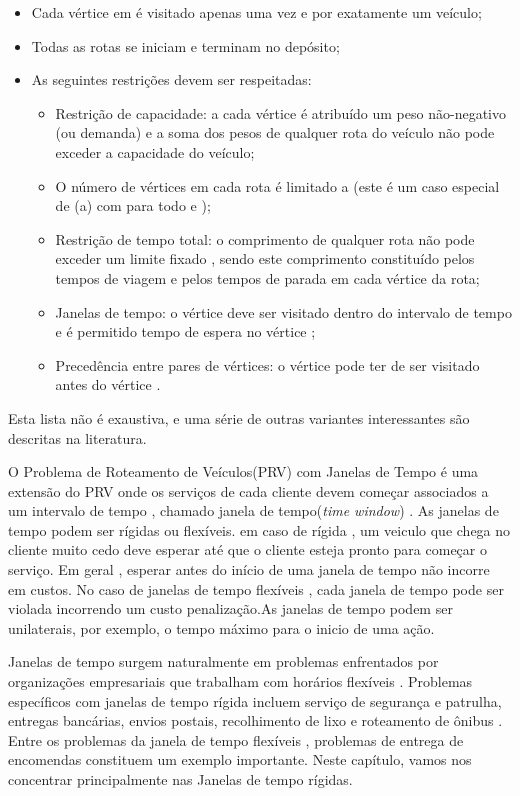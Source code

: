 \begin{itemize}
\item Cada vértice em é visitado apenas uma vez e por exatamente um veículo;
\item Todas as rotas se iniciam e terminam no depósito;
\item As seguintes restrições devem ser respeitadas:
\begin{itemize}
\item Restrição de capacidade: a cada vértice é atribuído um peso não-negativo (ou demanda) e a soma dos pesos de qualquer rota do veículo não pode exceder a capacidade do veículo;
\item O número de vértices em cada rota é limitado a (este é um caso especial de (a) com para todo e );
\item Restrição de tempo total: o comprimento de qualquer rota não pode exceder um limite fixado , sendo este comprimento constituído pelos tempos de viagem e pelos tempos de parada em cada vértice da rota; 
\item Janelas de tempo: o vértice deve ser visitado dentro do intervalo de tempo e é permitido tempo de espera no vértice ;
\item Precedência entre pares de vértices: o vértice pode ter de ser visitado antes do vértice .
\end{itemize}
\end{itemize}


Esta lista não é exaustiva, e uma série de outras variantes interessantes são descritas na literatura.


O Problema de Roteamento de Veículos(PRV) com Janelas de Tempo é uma extensão do PRV onde os serviços de cada cliente devem começar associados a um intervalo de tempo , chamado janela de tempo(\textit{time window}) . As janelas de tempo podem ser rígidas ou flexíveis. em caso de rígida , um veiculo que chega no cliente muito cedo deve esperar até que o cliente esteja pronto para começar o serviço. Em geral , esperar antes do início de uma janela de tempo não incorre em custos. No caso de janelas de tempo flexíveis , cada janela de tempo pode ser violada incorrendo um custo penalização.As janelas de tempo podem ser unilaterais, por exemplo, o tempo máximo para o inicio de uma ação.


Janelas de tempo surgem naturalmente em problemas enfrentados por organizações empresariais que trabalham com horários flexíveis . Problemas específicos com janelas de tempo rígida incluem serviço de segurança e patrulha, entregas bancárias, envios postais, recolhimento de lixo e roteamento de ônibus . Entre os problemas da janela de tempo flexíveis , problemas de entrega de encomendas constituem um exemplo importante. Neste capítulo, vamos nos concentrar principalmente nas Janelas de tempo rígidas.




